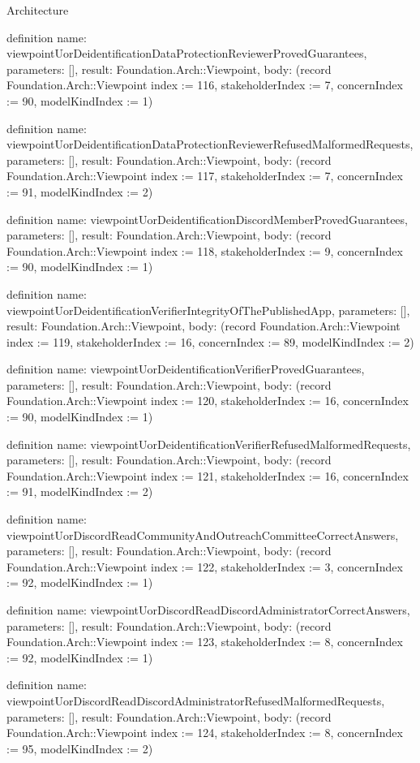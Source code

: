 \begin{lexlean}{Architecture}
\begin{semanticmodule}
definition{
  name: viewpointUorDeidentificationDataProtectionReviewerProvedGuarantees,
  parameters: [],
  result: Foundation.Arch::Viewpoint,
  body: (record Foundation.Arch::Viewpoint {index := 116, stakeholderIndex := 7, concernIndex := 90, modelKindIndex := 1})
}

definition{
  name: viewpointUorDeidentificationDataProtectionReviewerRefusedMalformedRequests,
  parameters: [],
  result: Foundation.Arch::Viewpoint,
  body: (record Foundation.Arch::Viewpoint {index := 117, stakeholderIndex := 7, concernIndex := 91, modelKindIndex := 2})
}

definition{
  name: viewpointUorDeidentificationDiscordMemberProvedGuarantees,
  parameters: [],
  result: Foundation.Arch::Viewpoint,
  body: (record Foundation.Arch::Viewpoint {index := 118, stakeholderIndex := 9, concernIndex := 90, modelKindIndex := 1})
}

definition{
  name: viewpointUorDeidentificationVerifierIntegrityOfThePublishedApp,
  parameters: [],
  result: Foundation.Arch::Viewpoint,
  body: (record Foundation.Arch::Viewpoint {index := 119, stakeholderIndex := 16, concernIndex := 89, modelKindIndex := 2})
}

definition{
  name: viewpointUorDeidentificationVerifierProvedGuarantees,
  parameters: [],
  result: Foundation.Arch::Viewpoint,
  body: (record Foundation.Arch::Viewpoint {index := 120, stakeholderIndex := 16, concernIndex := 90, modelKindIndex := 1})
}

definition{
  name: viewpointUorDeidentificationVerifierRefusedMalformedRequests,
  parameters: [],
  result: Foundation.Arch::Viewpoint,
  body: (record Foundation.Arch::Viewpoint {index := 121, stakeholderIndex := 16, concernIndex := 91, modelKindIndex := 2})
}

definition{
  name: viewpointUorDiscordReadCommunityAndOutreachCommitteeCorrectAnswers,
  parameters: [],
  result: Foundation.Arch::Viewpoint,
  body: (record Foundation.Arch::Viewpoint {index := 122, stakeholderIndex := 3, concernIndex := 92, modelKindIndex := 1})
}

definition{
  name: viewpointUorDiscordReadDiscordAdministratorCorrectAnswers,
  parameters: [],
  result: Foundation.Arch::Viewpoint,
  body: (record Foundation.Arch::Viewpoint {index := 123, stakeholderIndex := 8, concernIndex := 92, modelKindIndex := 1})
}

definition{
  name: viewpointUorDiscordReadDiscordAdministratorRefusedMalformedRequests,
  parameters: [],
  result: Foundation.Arch::Viewpoint,
  body: (record Foundation.Arch::Viewpoint {index := 124, stakeholderIndex := 8, concernIndex := 95, modelKindIndex := 2})
}


\end{semanticmodule}
\end{lexlean}
